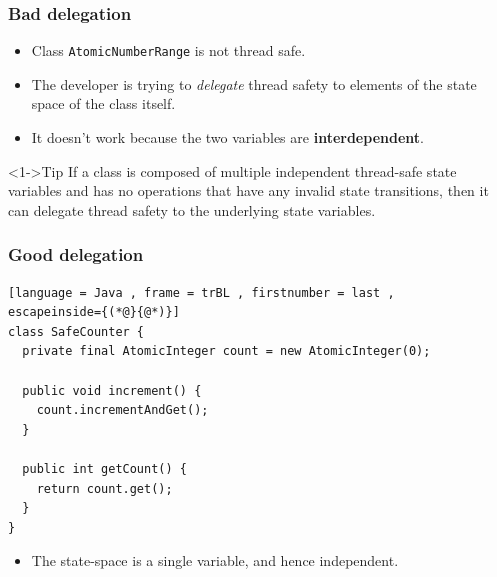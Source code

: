 \documentclass[xcolor={dvipsnames,svgnames},aspectratio=169]{beamer}
\begin{document}
\begin{frame}[fragile]
  \frametitle{Bad delegation}

  \begin{itemize}
  \item[\faBook]<1-> Class \texttt{AtomicNumberRange} is not thread safe.
  \item[\faBook]<1-> The developer is trying to \emph{delegate} thread safety to
    elements of the state space of the class itself.
  \item[\faBook]<1-> It doesn't work because the two variables are
    \textbf{interdependent}.
  \end{itemize}
  \vspace{0.2cm}
  \begin{block}<1->{\faLightbulb\quad Tip}
    If a class is composed of multiple independent thread-safe state variables
    and has no operations that have any invalid state transitions, then it can
    delegate thread safety to the underlying state variables.
  \end{block}
\end{frame}

\begin{frame}[fragile]
  \frametitle{Good delegation}

\begin{lstlisting}[language = Java , frame = trBL , firstnumber = last ,
escapeinside={(*@}{@*)}]
class SafeCounter {
  private final AtomicInteger count = new AtomicInteger(0);

  public void increment() {
    count.incrementAndGet();
  }

  public int getCount() {
    return count.get();
  }
}
\end{lstlisting}
  \begin{itemize}
  \item[\faBook]<2-> The state-space is a single variable, and hence independent.
  \end{itemize}

\end{frame}
\end{document}
